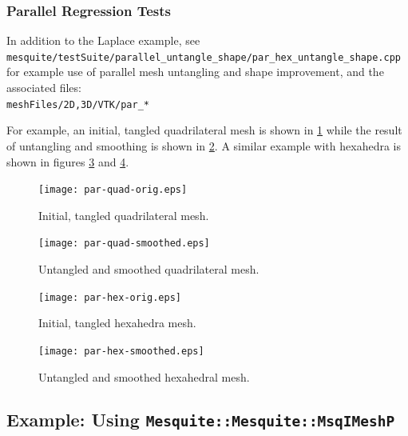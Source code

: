 \subsubsection{Parallel Regression Tests}

In addition to the Laplace example, see \\
\texttt{mesquite/testSuite/parallel\_untangle\_shape/par\_hex\_untangle\_shape.cpp} \\
for example use of parallel mesh untangling and shape improvement, and
the associated files:\\
\texttt{meshFiles/{2D,3D}/VTK/par\_*}

For example, an initial, tangled quadrilateral mesh is shown in
\ref{fig:par_quad_orig} 
while the result of untangling and smoothing is shown in
\ref{fig:par_quad_smoothed}.  A similar example with hexahedra is
shown in figures 
\ref{fig:par_hex_orig}  and \ref{fig:par_hex_smoothed}.

\begin{figure}[htpb]
\begin{center}
\texttt{[image: par-quad-orig.eps]}
\caption{Initial, tangled quadrilateral mesh.}
\label{fig:par_quad_orig}
\end{center}
\end{figure}

\begin{figure}[htpb]
\begin{center}
\texttt{[image: par-quad-smoothed.eps]}
\caption{Untangled and smoothed quadrilateral mesh.}
\label{fig:par_quad_smoothed}
\end{center}
\end{figure}

\begin{figure}[htpb]
\begin{center}
\texttt{[image: par-hex-orig.eps]}
\caption{Initial, tangled hexahedra mesh.}
\label{fig:par_hex_orig}
\end{center}
\end{figure}

\begin{figure}[htpb]
\begin{center}
\texttt{[image: par-hex-smoothed.eps]}
\caption{Untangled and smoothed hexahedral mesh.}
\label{fig:par_hex_smoothed}
\end{center}
\end{figure}

\subsection{Example: Using \texttt{Mesquite::Mesquite::MsqIMeshP}}

